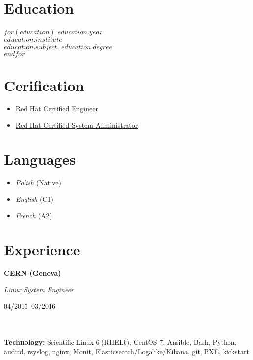 \documentclass[$fontsize$, a4paper]{article}
\newcommand\textbox[1]{%
  \parbox{.333\textwidth}{#1}%
}
\begin{document}
\begin{multicols}{2}

\section*{Education}
$for(education)$
$education.year$\\
\emph{$education.institute$}\\
\textbf{$education.subject$}, $education.degree$\\

$endfor$

\columnbreak

\section*{Cerification}

\begin{itemize}
  \setlength\itemsep{-0.5em}
  \item \href{https://www.redhat.com/rhtapps/certification/verify/?certId=140-054-446}{Red Hat Certified Engineer}
  \item \href{https://www.redhat.com/rhtapps/certification/verify/?certId=140-054-446}{Red Hat Certified System Administrator}
\end{itemize}

\section*{Languages}
\begin{itemize}
  \setlength\itemsep{-0.5em}
  \item \emph{Polish} (Native)
  \item \emph{English} (C1)
  \item \emph{French} (A2)
\end{itemize}

\end{multicols}

\vspace{-10pt}


\section*{Experience}
\noindent

\noindent\textbox{\textbf{\textsc{CERN} (Geneva)}\hfill}\textbox{\hfil \emph{Linux System Engineer}\hfil}\textbox{\hfill 04/2015--03/2016}\\\\
\textbf{Technology:} Scientific Linux 6 (RHEL6), CentOS 7, Ansible, Bash, Python, auditd, rsyslog, nginx, Monit, Elasticsearch/Logalike/Kibana, git, PXE, kickstart
\end{document}
